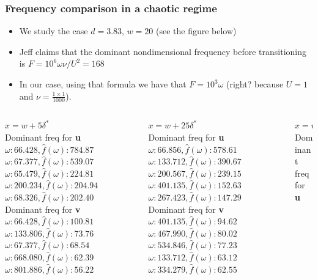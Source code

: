 \documentclass[
  aspectratio=169, %
  t, %
  onlytextwidth, %
  10pt, %
]{beamer}
\begin{document}
\begin{frame}
	\frametitle{Frequency comparison in a chaotic regime}
	\begin{itemize}
		\item We study the case $d=3.83$, $w=20$ (see the figure below)
		\item Jeff claims that the dominant nondimensional frequency before transitioning is $F=10^6 \omega \nu /U^2 = 168$
		\item In our case, using that formula we have that $F = 10^3 \omega$ (right? because $U=1$ and $\nu=\frac{1 \times 1}{1000}$).
	\end{itemize}
	\centering
	\small
	\begin{columns}[T] %
		\begin{column}{0.245\linewidth} %
			$x=w+5\delta^*$\\
			Dominant freq for \textbf{u}
			$ \omega : 66.428, \widehat{f}(\omega): 784.87$
			$ \omega : 67.377, \widehat{f}(\omega): 539.07$
			$ \omega : 65.479, \widehat{f}(\omega): 224.81$
			$ \omega : 200.234, \widehat{f}(\omega): 204.94$
			$ \omega : 68.326, \widehat{f}(\omega): 202.40$\\
			Dominant freq for \textbf{v}
			$ \omega : 66.428, \widehat{f}(\omega): 100.81$
			$ \omega : 133.806, \widehat{f}(\omega): 73.76$
			$ \omega : 67.377, \widehat{f}(\omega): 68.54$
			$ \omega : 668.080, \widehat{f}(\omega): 62.39$
			$ \omega : 801.886, \widehat{f}(\omega): 56.22$
		\end{column}
		\begin{column}{0.245\linewidth} %
			$x=w+25\delta^*$\\
			Dominant freq for \textbf{u}
			$ \omega : 66.856, \widehat{f}(\omega): 578.61$
			$ \omega : 133.712, \widehat{f}(\omega): 390.67$
			$ \omega : 200.567, \widehat{f}(\omega): 239.15$
			$ \omega : 401.135, \widehat{f}(\omega): 152.63$
			$ \omega : 267.423, \widehat{f}(\omega): 147.29$\\
			Dominant freq for \textbf{v}
			$ \omega : 401.135, \widehat{f}(\omega): 94.62$
			$ \omega : 467.990, \widehat{f}(\omega): 80.02$
			$ \omega : 534.846, \widehat{f}(\omega): 77.23$
			$ \omega : 133.712, \widehat{f}(\omega): 63.12$
			$ \omega : 334.279, \widehat{f}(\omega): 62.55$
		\end{column}
		\begin{column}{0.245\linewidth} %
			$x=w+75\delta^*$\\
			Dominant freq for \textbf{u}

\end{column}
\end{columns}
\end{frame}
\end{document}
